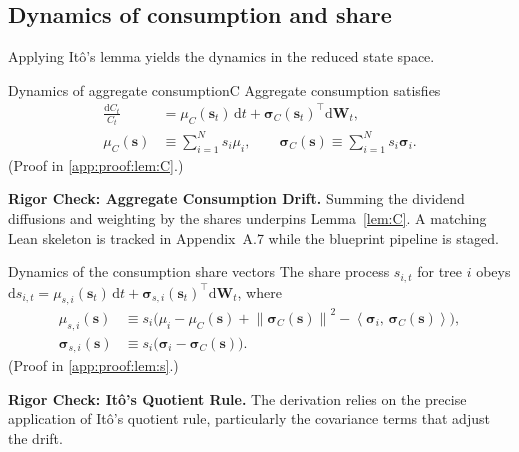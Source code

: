 \documentclass[11pt,letterpaper,oneside]{article}
\numberwithin{equation}{section}
\newcommand{\LeanMintedOptions}{fontsize=\footnotesize, breaklines, linenos, numbersep=0.85em}
\newcommand{\leanfile}[2][]{\inputminted[\LeanMintedOptions,##1]{lean4}{##2}}%
\newcommand{\leanfile}[2][]{}%
\newcommand{\leanfile}[2][]{}%
\newcommand{\1}{\mathbf{1}}
\newcommand{\diff}{\mathrm{d}}
\newcommand{\norm}[1]{\left\lVert #1\right\rVert}
\newcommand{\ip}[2]{\left\langle #1,\,#2\right\rangle}
\begin{document}
\subsection{Dynamics of consumption and share}
Applying It\^o's lemma yields the dynamics in the reduced state space.

\begin{lemma}{Dynamics of aggregate consumption}{C}
Aggregate consumption satisfies
\begin{align}
  \frac{\diff C_t}{C_t}
  &= \mu_C(\bm{s}_t)\,\diff t + \bm{\sigma}_C(\bm{s}_t)^{\top}\diff \bm{W}_t,
  \label{eq:C_drift}\\
  \mu_C(\bm{s}) &\equiv \sum_{i=1}^N s_i\mu_i,
  \qquad
  \bm{\sigma}_C(\bm{s}) \equiv \sum_{i=1}^N s_i\bm{\sigma}_i.
  \label{eq:sigmaC_def}
\end{align}
(Proof in \cref{app:proof:lem:C}.)
\end{lemma}


\begin{tcolorbox}[mathstyle]
\textbf{Rigor Check: Aggregate Consumption Drift.} Summing the dividend diffusions and weighting by the shares underpins Lemma~\ref{lem:C}. A matching Lean skeleton is tracked in Appendix~A.7 while the blueprint pipeline is staged.
\end{tcolorbox}

\begin{lemma}{Dynamics of the consumption share vector}{s}
The share process $s_{i,t}$ for tree $i$ obeys $\diff s_{i,t}=\mu_{s,i}(\bm{s}_t)\,\diff t+\bm{\sigma}_{s,i}(\bm{s}_t)^{\top}\diff\bm{W}_t$, where
\begin{align}
  \mu_{s,i}(\bm{s}) &\equiv s_i\Big(\mu_i-\mu_C(\bm{s})+
\norm{\bm{\sigma}_C(\bm{s})}^2-\ip{\bm{\sigma}_i}{\bm{\sigma}_C(\bm{s})}\Big), \\
  \bm{\sigma}_{s,i}(\bm{s}) &\equiv s_i\big(\bm{\sigma}_i-\bm{\sigma}_C(\bm{s})\big).
\end{align}
(Proof in \cref{app:proof:lem:s}.)
\end{lemma}

\begin{tcolorbox}[mathstyle]
  	\textbf{Rigor Check: It\^o's Quotient Rule.} The derivation relies on the precise application of It\^o's quotient rule, particularly the covariance terms that adjust the drift.
\end{tcolorbox}
\end{document}
